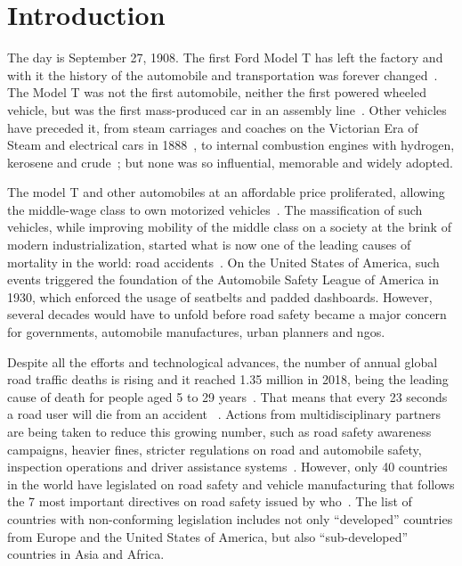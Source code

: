 \chapter{Introduction}
\label{chapter:introduction}

The day is September 27, 1908. The first Ford Model T has left the factory and with it the history of the automobile and transportation was forever changed~\cite{Ford, JohnSteeleGordon2007}. The Model T was not the first automobile, neither the first powered wheeled vehicle, but was the first mass-produced car in an assembly line~\cite{JohnSteeleGordon2007, DailyNews2013}. Other vehicles have preceded it, from steam carriages and coaches on the Victorian Era of Steam and electrical cars in 1888~\cite{PaulA.Hughes}, to internal combustion engines with hydrogen, kerosene and crude~\cite{Setright2003}; but none was so influential, memorable and widely adopted. 

The model T and other automobiles at an affordable price proliferated, allowing the middle-wage class to own motorized vehicles~\cite{JohnSteeleGordon2007, DailyNews2013}. The massification of such vehicles, while improving mobility of the middle class on a society at the brink of modern industrialization, started what is now one of the leading causes of mortality in the world: road accidents~\cite{WHO2018}. On the United States of America, such events triggered the foundation of the Automobile Safety League of America in 1930, which enforced the usage of seatbelts and padded dashboards. However, several decades would have to unfold before road safety became a major concern for governments, automobile manufactures, urban planners and \acp{ngo}. 

Despite all the efforts and technological advances, the number of annual global road traffic deaths is rising and it reached 1.35 million in 2018, being the leading cause of death for people aged 5 to 29 years~\cite{WHO2018}. That means that every 23 seconds a road user will die from an accident%
~\cite{WHOvisualizer}. Actions from multidisciplinary partners are being taken to reduce this growing number, such as road safety awareness campaigns, heavier fines, stricter regulations on road and automobile safety, inspection operations and driver assistance systems~\cite{WHO2018, EUroads}. However, only 40 countries in the world have legislated on road safety and vehicle manufacturing that follows the 7 most important directives on road safety issued by \acf{who}~\cite{WHOvisualizer}. The list of countries with non-conforming legislation includes not only ``developed'' countries from Europe and the United States of America, but also ``sub-developed'' countries in Asia and Africa.

